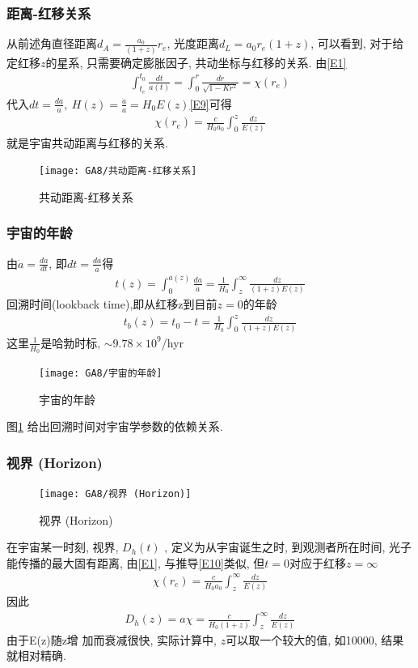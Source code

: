 \subsubsection{距离-红移关系}
从前述角直径距离$d_A=\frac{a_0}{(1+z)}r_e$, 光度距离$d_L=a_0r_e(1+z)$, 可以看到, 对于给定红移$z$的星系, 只需要确定膨胀因子, 共动坐标与红移的关系. 由\ref{E1}
\begin{align*}
    \int_{t_e}^{t_0}\frac{dt}{a(t)}=\int_0^r\frac{dr}{\sqrt{1-Kr^2}}=\chi(r_e)
\end{align*}
代入$dt=\frac{da}{\dot{a}},\ H(z)=\frac{\dot{a}}{a}=H_0E(z)$\ref{E9}可得
\begin{align}
    \chi(r_e)=\frac{c}{H_0 a_0}\int_0^z\frac{dz}{E(z)}\label{E10}
\end{align}
就是宇宙共动距离与红移的关系. 
\begin{figure}[!htb]
    \centering
    \texttt{[image: GA8/共动距离-红移关系]}
    \caption{共动距离-红移关系}
\end{figure}


\subsubsection{宇宙的年龄}
由$\dot{a}=\frac{da}{dt}$, 即$dt=\frac{da}{\dot{a}}$得
\begin{align*}
    t(z)=\int_0^{a(z)}\frac{da}{\dot{a}}=\frac{1}{H_0}\int_z^\infty\frac{dz}{(1+z)E(z)}
\end{align*}
回溯时间(lookback time),即从红移z到目前$z=0$的年龄
\begin{align*}
    t_b(z)=t_0-t=\frac{1}{H_0}\int_0^z\frac{dz}{(1+z)E(z)}
\end{align*}
这里$\frac{1}{H_0}$是哈勃时标, $\sim 9.78\times 10^9$/hyr

\begin{figure}[!htb]
    \centering
    \texttt{[image: GA8/宇宙的年龄]}
    \caption{宇宙的年龄}
    \label{宇宙的年龄}
\end{figure}
图\ref{宇宙的年龄} 给出回溯时间对宇宙学参数的依赖关系. 

\subsubsection{视界 (Horizon)}

\begin{figure}[!htb]
    \centering
    \texttt{[image: GA8/视界 (Horizon)]}
    \caption{视界 (Horizon)}
\end{figure}

在宇宙某一时刻, 视界, $D_h(t)$ , 定义为从宇宙诞生之时, 到观测者所在时间, 光子能传播的最大固有距离, 由\ref{E1}, 与推导\ref{E10}类似, 但$t=0$对应于红移$z=\infty$
\begin{align}
    \chi(r_e)=\frac{c}{H_0 a_0}\int_z^\infty\frac{dz}{E(z)} \label{E11}
\end{align}
因此
\begin{align*}
    D_h(z)=a\chi=\frac{c}{H_0 (1+z)}\int_z^\infty\frac{dz}{E(z)}
\end{align*}
由于E(z)随z增
加而衰减很快, 实际计算中, $z$可以取一个较大的值, 如10000, 结果就相对精确. 

